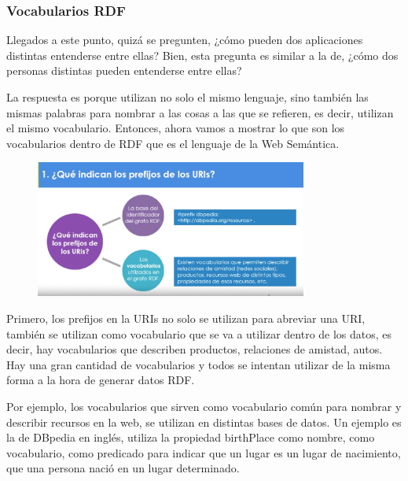 \subsubsection{Vocabularios RDF} %

Llegados a este punto, quizá se pregunten, ¿cómo pueden dos aplicaciones distintas entenderse entre ellas? Bien, esta pregunta es similar a la de, ¿cómo dos personas distintas pueden entenderse entre ellas?

La respuesta es porque utilizan no solo el mismo lenguaje, sino también las mismas palabras para nombrar a las cosas a las que se refieren, es decir, utilizan el mismo vocabulario. Entonces, ahora vamos a mostrar lo que son los vocabularios dentro de RDF que es el lenguaje de la Web Semántica.

\begin{figure}[H]
	\centering
	\includegraphics[height=4.5cm]{imagenes/capitulo3/20} 
	\caption{}
	\label{}
\end{figure}

Primero, los prefijos en la URIs no solo se utilizan para abreviar una URI, también se utilizan como vocabulario que se va a utilizar dentro de los datos, es decir, hay vocabularios que describen productos, relaciones de amistad, autos. Hay una gran cantidad de vocabularios y todos se intentan utilizar de la misma forma a la hora de generar datos RDF.

Por ejemplo, los vocabularios que sirven como vocabulario común para nombrar y describir recursos en la web, se utilizan en distintas bases de datos. Un ejemplo es la de DBpedia en inglés, utiliza la propiedad birthPlace como nombre, como vocabulario, como predicado para indicar que un lugar es un lugar de nacimiento, que una persona nació en un lugar determinado.

